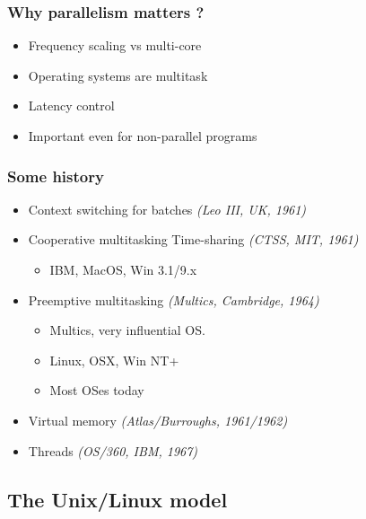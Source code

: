 \begin{frame}
  \frametitle{Why parallelism matters ?}
  \begin{itemize}
  \item Frequency scaling vs multi-core
  \item Operating systems are multitask
  \item Latency control
  \item Important even for non-parallel programs
  \end{itemize}
\end{frame}


\begin{frame}
  \frametitle{Some history}

  \begin{itemize}
  \item Context switching for batches \emph{(Leo III, UK, 1961)}
  \item Cooperative multitasking Time-sharing \emph{(CTSS, MIT, 1961)}
    \begin{itemize}
    \item IBM, MacOS, Win 3.1/9.x
    \end{itemize}
  \item Preemptive multitasking \emph{(Multics, Cambridge, 1964)}
    \begin{itemize}
    \item Multics, very influential OS.
    \item Linux, OSX, Win NT+
    \item Most OSes today
    \end{itemize}
  \item Virtual memory \emph{(Atlas/Burroughs, 1961/1962)}
  \item Threads \emph{(OS/360, IBM, 1967)}
  \end{itemize}
\end{frame}





\subsection{The Unix/Linux model}
\label{subsec:linuxmodel}


